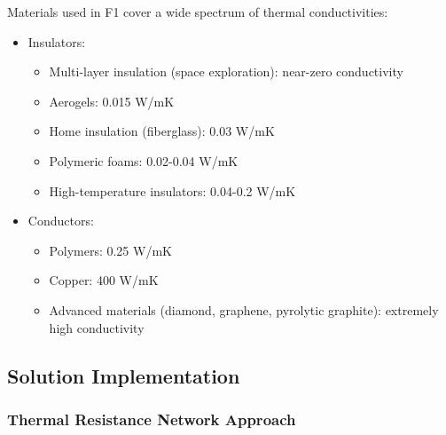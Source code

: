Materials used in F1 cover a wide spectrum of thermal conductivities:
\begin{itemize}
    \item Insulators:
    \begin{itemize}
        \item Multi-layer insulation (space exploration): near-zero conductivity
        \item Aerogels: 0.015 W/mK
        \item Home insulation (fiberglass): 0.03 W/mK
        \item Polymeric foams: 0.02-0.04 W/mK
        \item High-temperature insulators: 0.04-0.2 W/mK
    \end{itemize}
    \item Conductors:
    \begin{itemize}
        \item Polymers: 0.25 W/mK
        \item Copper: 400 W/mK
        \item Advanced materials (diamond, graphene, pyrolytic graphite): extremely high conductivity
    \end{itemize}
\end{itemize}

\subsection*{Solution Implementation}

\subsubsection*{Thermal Resistance Network Approach}

